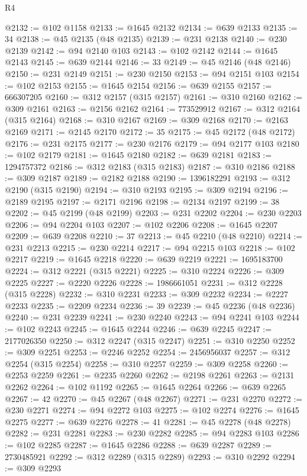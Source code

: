 \begin{lexlean}{R4}
\begin{coremodule}
@2132 := @102 @1158
@2133 := @1645 @2132
@2134 := @639 @2133
@2135 := 34
@2138 := @45 @2135 (@48 @2135)
@2139 := @231 @2138
@2140 := @230 @2139
@2142 := @94 @2140 @103
@2143 := @102 @2142
@2144 := @1645 @2143
@2145 := @639 @2144
@2146 := 33
@2149 := @45 @2146 (@48 @2146)
@2150 := @231 @2149
@2151 := @230 @2150
@2153 := @94 @2151 @103
@2154 := @102 @2153
@2155 := @1645 @2154
@2156 := @639 @2155
@2157 := 666307205
@2160 := @312 @2157 (@315 @2157)
@2161 := @310 @2160
@2162 := @309 @2161
@2163 := @2156 @2162
@2164 := 773529912
@2167 := @312 @2164 (@315 @2164)
@2168 := @310 @2167
@2169 := @309 @2168
@2170 := @2163 @2169
@2171 := @2145 @2170
@2172 := 35
@2175 := @45 @2172 (@48 @2172)
@2176 := @231 @2175
@2177 := @230 @2176
@2179 := @94 @2177 @103
@2180 := @102 @2179
@2181 := @1645 @2180
@2182 := @639 @2181
@2183 := 1294757372
@2186 := @312 @2183 (@315 @2183)
@2187 := @310 @2186
@2188 := @309 @2187
@2189 := @2182 @2188
@2190 := 1396182291
@2193 := @312 @2190 (@315 @2190)
@2194 := @310 @2193
@2195 := @309 @2194
@2196 := @2189 @2195
@2197 := @2171 @2196
@2198 := @2134 @2197
@2199 := 38
@2202 := @45 @2199 (@48 @2199)
@2203 := @231 @2202
@2204 := @230 @2203
@2206 := @94 @2204 @103
@2207 := @102 @2206
@2208 := @1645 @2207
@2209 := @639 @2208
@2210 := 37
@2213 := @45 @2210 (@48 @2210)
@2214 := @231 @2213
@2215 := @230 @2214
@2217 := @94 @2215 @103
@2218 := @102 @2217
@2219 := @1645 @2218
@2220 := @639 @2219
@2221 := 1695183700
@2224 := @312 @2221 (@315 @2221)
@2225 := @310 @2224
@2226 := @309 @2225
@2227 := @2220 @2226
@2228 := 1986661051
@2231 := @312 @2228 (@315 @2228)
@2232 := @310 @2231
@2233 := @309 @2232
@2234 := @2227 @2233
@2235 := @2209 @2234
@2236 := 39
@2239 := @45 @2236 (@48 @2236)
@2240 := @231 @2239
@2241 := @230 @2240
@2243 := @94 @2241 @103
@2244 := @102 @2243
@2245 := @1645 @2244
@2246 := @639 @2245
@2247 := 2177026350
@2250 := @312 @2247 (@315 @2247)
@2251 := @310 @2250
@2252 := @309 @2251
@2253 := @2246 @2252
@2254 := 2456956037
@2257 := @312 @2254 (@315 @2254)
@2258 := @310 @2257
@2259 := @309 @2258
@2260 := @2253 @2259
@2261 := @2235 @2260
@2262 := @2198 @2261
@2263 := @2131 @2262
@2264 := @102 @1192
@2265 := @1645 @2264
@2266 := @639 @2265
@2267 := 42
@2270 := @45 @2267 (@48 @2267)
@2271 := @231 @2270
@2272 := @230 @2271
@2274 := @94 @2272 @103
@2275 := @102 @2274
@2276 := @1645 @2275
@2277 := @639 @2276
@2278 := 41
@2281 := @45 @2278 (@48 @2278)
@2282 := @231 @2281
@2283 := @230 @2282
@2285 := @94 @2283 @103
@2286 := @102 @2285
@2287 := @1645 @2286
@2288 := @639 @2287
@2289 := 2730485921
@2292 := @312 @2289 (@315 @2289)
@2293 := @310 @2292
@2294 := @309 @2293

\end{coremodule}
\end{lexlean}
